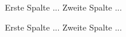 \begin{cols2}[5cm]
  Erste Spalte ...
  \colbreak
  Zweite Spalte ...
\end{cols2}

\begin{cols2}[0.35\linewidth]
  Erste Spalte ...
  \colbreak
  Zweite Spalte ...
\end{cols2}
